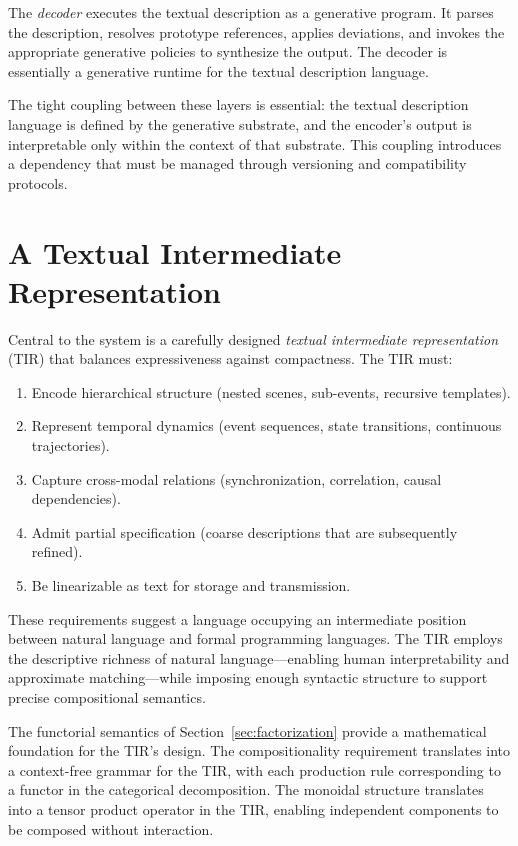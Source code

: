 \documentclass[12pt,a4paper]{article}
\theoremstyle{definition}
\theoremstyle{remark}
\begin{document}
The \emph{decoder} executes the textual description as a generative program. It parses the description, resolves prototype references, applies deviations, and invokes the appropriate generative policies to synthesize the output. The decoder is essentially a generative runtime for the textual description language.

The tight coupling between these layers is essential: the textual description language is defined by the generative substrate, and the encoder's output is interpretable only within the context of that substrate. This coupling introduces a dependency that must be managed through versioning and compatibility protocols.

\section{A Textual Intermediate Representation}
\label{sec:TIR}

Central to the system is a carefully designed \emph{textual intermediate representation} (TIR) that balances expressiveness against compactness. The TIR must:

\begin{enumerate}[noitemsep]
\item Encode hierarchical structure (nested scenes, sub-events, recursive templates).
\item Represent temporal dynamics (event sequences, state transitions, continuous trajectories).
\item Capture cross-modal relations (synchronization, correlation, causal dependencies).
\item Admit partial specification (coarse descriptions that are subsequently refined).
\item Be linearizable as text for storage and transmission.
\end{enumerate}

These requirements suggest a language occupying an intermediate position between natural language and formal programming languages. The TIR employs the descriptive richness of natural language---enabling human interpretability and approximate matching---while imposing enough syntactic structure to support precise compositional semantics.

The functorial semantics of Section~\ref{sec:factorization} provide a mathematical foundation for the TIR's design. The compositionality requirement translates into a context-free grammar for the TIR, with each production rule corresponding to a functor in the categorical decomposition. The monoidal structure translates into a tensor product operator in the TIR, enabling independent components to be composed without interaction.
\end{document}
